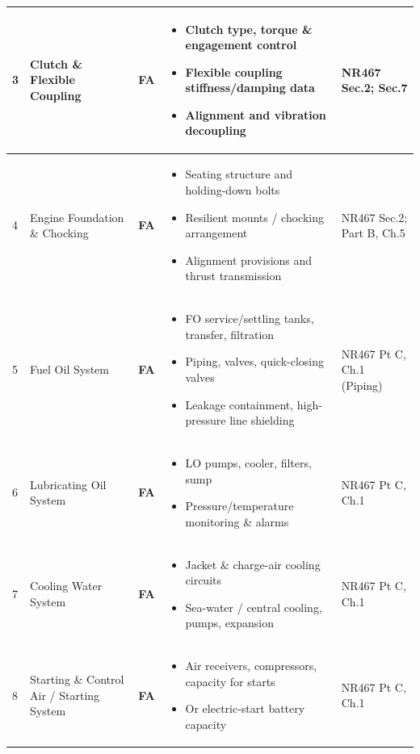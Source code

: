 \documentclass[11pt,a4paper]{report}
\newcommand{\fa}{\textbf{\textcolor{warningred}{FA}}}
\begin{document}
\begin{longtable}{|p{0.5cm}|p{5cm}|p{1.5cm}|p{5.5cm}|p{2cm}|}
3 & Clutch \& Flexible Coupling & \fa{} &
\begin{itemize}[leftmargin=*,nosep]
\item Clutch type, torque \& engagement control
\item Flexible coupling stiffness/damping data
\item Alignment and vibration decoupling
\end{itemize} & NR467 Sec.2; Sec.7 \\
\hline

4 & Engine Foundation \& Chocking & \fa{} &
\begin{itemize}[leftmargin=*,nosep]
\item Seating structure and holding-down bolts
\item Resilient mounts / chocking arrangement
\item Alignment provisions and thrust transmission
\end{itemize} & NR467 Sec.2; Part B, Ch.5 \\
\hline

5 & Fuel Oil System & \fa{} &
\begin{itemize}[leftmargin=*,nosep]
\item FO service/settling tanks, transfer, filtration
\item Piping, valves, quick-closing valves
\item Leakage containment, high-pressure line shielding
\end{itemize} & NR467 Pt C, Ch.1 (Piping) \\
\hline

6 & Lubricating Oil System & \fa{} &
\begin{itemize}[leftmargin=*,nosep]
\item LO pumps, cooler, filters, sump
\item Pressure/temperature monitoring \& alarms
\end{itemize} & NR467 Pt C, Ch.1 \\
\hline

7 & Cooling Water System & \fa{} &
\begin{itemize}[leftmargin=*,nosep]
\item Jacket \& charge-air cooling circuits
\item Sea-water / central cooling, pumps, expansion
\end{itemize} & NR467 Pt C, Ch.1 \\
\hline

8 & Starting \& Control Air / Starting System & \fa{} &
\begin{itemize}[leftmargin=*,nosep]
\item Air receivers, compressors, capacity for starts
\item Or electric-start battery capacity
\end{itemize} & NR467 Pt C, Ch.1 \\
\hline


\end{longtable}
\end{document}
